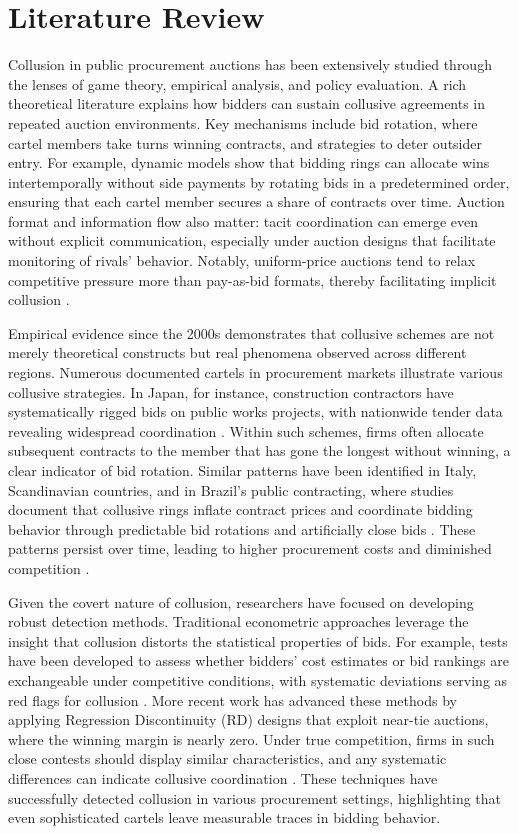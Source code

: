 \section{Literature Review}\label{literature}
Collusion in public procurement auctions has been extensively studied through the lenses of game theory, empirical analysis, and policy evaluation. A rich theoretical literature explains how bidders can sustain collusive agreements in repeated auction environments. Key mechanisms include bid rotation, where cartel members take turns winning contracts, and strategies to deter outsider entry. For example, dynamic models show that bidding rings can allocate wins intertemporally without side payments by rotating bids in a predetermined order, ensuring that each cartel member secures a share of contracts over time. Auction format and information flow also matter: tacit coordination can emerge even without explicit communication, especially under auction designs that facilitate monitoring of rivals’ behavior. Notably, uniform-price auctions tend to relax competitive pressure more than pay-as-bid formats, thereby facilitating implicit collusion \citep{porter1993detecting}.

Empirical evidence since the 2000s demonstrates that collusive schemes are not merely theoretical constructs but real phenomena observed across different regions. Numerous documented cartels in procurement markets illustrate various collusive strategies. In Japan, for instance, construction contractors have systematically rigged bids on public works projects, with nationwide tender data revealing widespread coordination \citep{kawai2023using}. Within such schemes, firms often allocate subsequent contracts to the member that has gone the longest without winning, a clear indicator of bid rotation. Similar patterns have been identified in Italy, Scandinavian countries, and in Brazil’s public contracting, where studies document that collusive rings inflate contract prices and coordinate bidding behavior through predictable bid rotations and artificially close bids \citep{bajari2003detecting}. These patterns persist over time, leading to higher procurement costs and diminished competition \citep{conley2016detecting}.

Given the covert nature of collusion, researchers have focused on developing robust detection methods. Traditional econometric approaches leverage the insight that collusion distorts the statistical properties of bids. For example, tests have been developed to assess whether bidders’ cost estimates or bid rankings are exchangeable under competitive conditions, with systematic deviations serving as red flags for collusion \citep{bajari2003detecting}. More recent work has advanced these methods by applying Regression Discontinuity (RD) designs that exploit near-tie auctions, where the winning margin is nearly zero. Under true competition, firms in such close contests should display similar characteristics, and any systematic differences can indicate collusive coordination \citep{imhof2018screening}. These techniques have successfully detected collusion in various procurement settings, highlighting that even sophisticated cartels leave measurable traces in bidding behavior.

